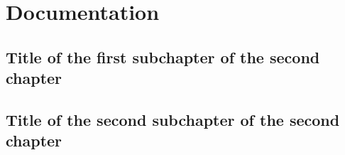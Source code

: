 \chapter{Documentation}

\section{Title of the first subchapter of the second chapter}

\section{Title of the second subchapter of the second chapter}
